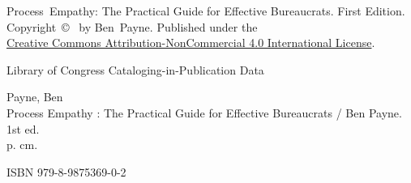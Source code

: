 \thispagestyle{empty}

\noindent Process~Empathy: The Practical Guide for Effective Bureaucrats. First Edition. \\Copyright~\copyright~\the\year{}
 by Ben~Payne. 
Published under the \\
\href{https://creativecommons.org/licenses/by-nc/4.0/}{Creative Commons Attribution-NonCommercial 4.0 International License}.


\vspace*{\fill}



\noindent Library of Congress Cataloging-in-Publication Data

\noindent Payne, Ben\\
Process Empathy : The Practical Guide for Effective Bureaucrats / Ben Payne. 1st ed.\\
p. cm.

\noindent ISBN 979-8-9875369-0-2
